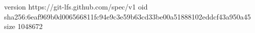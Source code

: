 version https://git-lfs.github.com/spec/v1
oid sha256:6eaf969b0d006566811fc94e9c3e59b63cd33be00a51888102eddcf43a950a45
size 1048672
